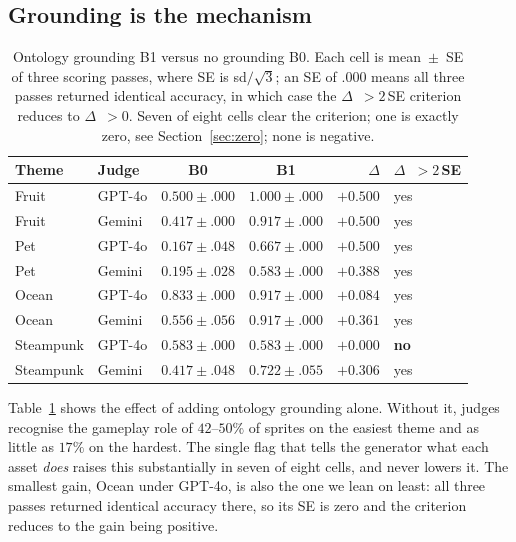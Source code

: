 \documentclass{article}
\newcommand{\D}{\ensuremath{\Delta}}
\begin{document}
\subsection{Grounding is the mechanism}

\begin{table}[t]
  \centering
  \caption{Ontology grounding B1 versus no grounding B0. Each cell is mean~$\pm$~SE of three
  scoring passes, where SE is sd$/\sqrt{3}$; an SE of $.000$ means all three passes returned
  identical accuracy, in which case the \D~$>2$\,SE criterion reduces to \D~$>0$. Seven of eight
  cells clear the criterion; one is exactly zero, see Section~\ref{sec:zero}; none is negative.}
  \label{tab:main}
  \small
  \begin{tabular}{@{}llccrl@{}}
    \toprule
    Theme & Judge & B0 & B1 & \D & \D~$>2$\,SE \\
    \midrule
    Fruit     & GPT-4o & $0.500 \pm .000$ & $1.000 \pm .000$ & $+0.500$ & yes \\
    Fruit     & Gemini & $0.417 \pm .000$ & $0.917 \pm .000$ & $+0.500$ & yes \\
    Pet       & GPT-4o & $0.167 \pm .048$ & $0.667 \pm .000$ & $+0.500$ & yes \\
    Pet       & Gemini & $0.195 \pm .028$ & $0.583 \pm .000$ & $+0.388$ & yes \\
    Ocean     & GPT-4o & $0.833 \pm .000$ & $0.917 \pm .000$ & $+0.084$ & yes \\
    Ocean     & Gemini & $0.556 \pm .056$ & $0.917 \pm .000$ & $+0.361$ & yes \\
    Steampunk & GPT-4o & $0.583 \pm .000$ & $0.583 \pm .000$ & $+0.000$ & \textbf{no} \\
    Steampunk & Gemini & $0.417 \pm .048$ & $0.722 \pm .055$ & $+0.306$ & yes \\
    \bottomrule
  \end{tabular}
\end{table}

Table~\ref{tab:main} shows the effect of adding ontology grounding alone. Without it, judges
recognise the gameplay role of $42$--$50\%$ of sprites on the easiest theme and as little as $17\%$
on the hardest. The single flag that tells the generator what each asset \emph{does} raises this
substantially in seven of eight cells, and never lowers it. The smallest gain, Ocean under GPT-4o,
is also the one we lean on least: all three passes returned identical accuracy there, so its SE is
zero and the criterion reduces to the gain being positive.
\end{document}
